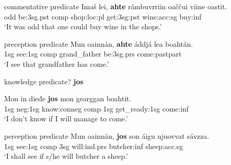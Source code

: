 \documentclass[a4,12pt]{scrartcl}
\begin{document}
\begin{exe}
	\ex  commentative predicate \label{ahteSubject} \citep[194]{nickel1994} 
	\gll 	Imaš 	lei, 	{\bf ahte} 	rámbuvrriin 	oaččui 	viine 	oastit.\\
	odd 	be:{\sc 3sg.pst} {\sc comp} shop:{\sc loc:pl} get:{\sc 3sg:pst} wine:{\sc acc:sg} buy:{\sc inf}\\
	\glt 	‘It was odd that one could buy wine in the shops.’
	
	\ex preception predicate \label{ahteObject} \citep[194]{nickel1994}
	\gll 	Mun 	oainnán, 	{\bf ahte} 	áddjá 	lea 	boahtán.\\
	{\sc 1sg} see:{\sc 1sg} {\sc comp} grand\_father be:{\sc 3sg.prs} come:{\sc pastpart}\\%
	\glt 	‘I see that grandfather has come.’
	
		 \ex knowledge predicate? \textbf{jos} \label{josObjekt}
	 	\begin{xlist}
		\ex 	
		\gll Mon in dieđe {\bf jos} mon gearggan boahtit.\\
		{\sc 1sg} {\sc neg:1sg} know:{\sc conneg} {\sc comp} {\sc 1sg} get\_ready:{\sc 1sg} come:{\sc inf}\\
		\glt ‘I don't know if I will manage to come.’ %
		
		\ex perception predicate
		\gll 	Mun 	oainnán, 	{\bf jos}  son áigu njuovvat sávzza.\\
		{\sc 1sg} see:{\sc 1sg} {\sc comp} {\sc 3sg} will:{\sc ind.prs} butcher:{\sc inf} sheep:{\sc acc.sg}\\
		\glt 	‘I shall see if s/he will butcher a sheep.’
		\end{xlist}	

%
%
%
	

\end{exe}
\end{document}
